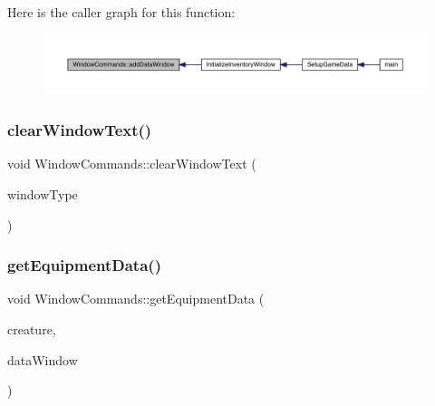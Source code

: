 Here is the caller graph for this function\+:
\nopagebreak
\begin{figure}[H]
\begin{center}
\leavevmode
\includegraphics[width=350pt]{da/d07/class_window_commands_ace8d243ff05f6535d2c6fe5bff6e5517_icgraph}
\end{center}
\end{figure}
\mbox{\label{class_window_commands_a74006a8f056f99594930592069c36604}} 
\subsubsection{\texorpdfstring{clear\+Window\+Text()}{clearWindowText()}}
{\footnotesize\ttfamily void Window\+Commands\+::clear\+Window\+Text (\begin{DoxyParamCaption}\item[{\mbox{\hyperlink{_data_window_8hpp_a3c1e0c6fe947fdbea7502497b27cf44d}{En\+Data\+Window\+Type}}}]{window\+Type }\end{DoxyParamCaption})}

\mbox{\label{class_window_commands_a53ed484ce3096298bc7260c02015f5aa}} 
\subsubsection{\texorpdfstring{get\+Equipment\+Data()}{getEquipmentData()}}
{\footnotesize\ttfamily void Window\+Commands\+::get\+Equipment\+Data (\begin{DoxyParamCaption}\item[{\mbox{\hyperlink{class_base_creature}{Base\+Creature}} \&}]{creature,  }\item[{\mbox{\hyperlink{class_data_window}{Data\+Window}} \&}]{data\+Window }\end{DoxyParamCaption})}

